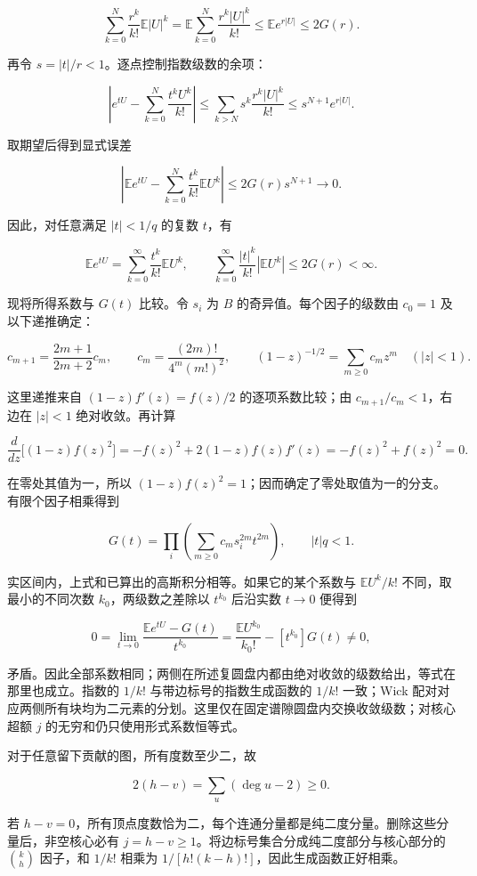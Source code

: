 \documentclass[11pt,a4paper]{article}
\begin{document}
\[
\sum_{k=0}^{N}\frac{r^k}{k!}\mathbb E|U|^k
=\mathbb E\sum_{k=0}^{N}\frac{r^k|U|^k}{k!}
\le\mathbb Ee^{r|U|}\le2G(r).
\]

再令 \(s=|t|/r<1\)。逐点控制指数级数的余项：

\[
\left|e^{tU}-\sum_{k=0}^{N}\frac{t^kU^k}{k!}\right|
\le\sum_{k>N}s^k\frac{r^k|U|^k}{k!}
\le s^{N+1}e^{r|U|}.
\]

取期望后得到显式误差

\[
\left|\mathbb Ee^{tU}-\sum_{k=0}^{N}\frac{t^k}{k!}\mathbb EU^k\right|
\le2G(r)s^{N+1}\longrightarrow0.
\]

因此，对任意满足 \(|t|<1/q\) 的复数 \(t\)，有

\[
\mathbb E e^{tU}
=\sum_{k=0}^{\infty}\frac{t^k}{k!}\mathbb E U^k,
\qquad
\sum_{k=0}^{\infty}\frac{|t|^k}{k!}|\mathbb E U^k|
\le2G(r)<\infty.
\]

现将所得系数与 \(G(t)\) 比较。令 \(s_i\) 为 \(B\) 的奇异值。每个因子的级数由 \(c_0=1\) 及以下递推确定：

\[
c_{m+1}=\frac{2m+1}{2m+2}c_m,
\qquad
c_m=\frac{(2m)!}{4^m(m!)^2},
\qquad
(1-z)^{-1/2}=\sum_{m\ge0}c_mz^m\quad(|z|<1).
\]

这里递推来自 \((1-z)f'(z)=f(z)/2\) 的逐项系数比较；由 \(c_{m+1}/c_m<1\)，右边在 \(|z|<1\) 绝对收敛。再计算

\[
\frac{d}{dz}\bigl[(1-z)f(z)^2\bigr]
=-f(z)^2+2(1-z)f(z)f'(z)
=-f(z)^2+f(z)^2=0.
\]

在零处其值为一，所以 \((1-z)f(z)^2=1\)；因而确定了零处取值为一的分支。有限个因子相乘得到

\[
G(t)=\prod_i\left(\sum_{m\ge0}c_m s_i^{2m}t^{2m}\right),
\qquad |t|q<1.
\]

实区间内，上式和已算出的高斯积分相等。如果它的某个系数与 \(\mathbb E U^k/k!\) 不同，取最小的不同次数 \(k_0\)，两级数之差除以 \(t^{k_0}\) 后沿实数 \(t\to0\) 便得到

\[
0=\lim_{t\to0}\frac{\mathbb Ee^{tU}-G(t)}{t^{k_0}}
=\frac{\mathbb E U^{k_0}}{k_0!}-[t^{k_0}]G(t)\ne0,
\]

矛盾。因此全部系数相同；两侧在所述复圆盘内都由绝对收敛的级数给出，等式在那里也成立。指数的 \(1/k!\) 与带边标号的指数生成函数的 \(1/k!\) 一致；Wick 配对对应两侧所有块均为二元素的分划。这里仅在固定谱隙圆盘内交换收敛级数；对核心超额 \(j\) 的无穷和仍只使用形式系数恒等式。

对于任意留下贡献的图，所有度数至少二，故

\[
2(h-v)=\sum_{u}(\deg u-2)\ge0.
\]

若 \(h-v=0\)，所有顶点度数恰为二，每个连通分量都是纯二度分量。删除这些分量后，非空核心必有 \(j=h-v\ge1\)。将边标号集合分成纯二度部分与核心部分的 \(\binom kh\) 因子，和 \(1/k!\) 相乘为 \(1/[h!(k-h)!]\)，因此生成函数正好相乘。
\end{document}
